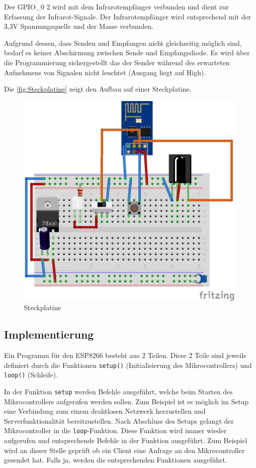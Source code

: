 Der \acs{GPIO}\_0 2 wird mit dem Infrarotempfänger verbunden und dient zur Erfassung der Infrarot-Signale.
Der Infrarotempfänger wird entsprechend mit der 3,3V Spannungsquelle und der Masse verbunden.

Aufgrund dessen, dass Senden und Empfangen nicht gleichzeitig möglich sind, bedarf es keiner Abschirmung zwischen Sende und Empfangsdiode. Es wird über die Programmierung sichergestellt das der Sender während des erwarteten Aufnehmens von Signalen nicht leuchtet (Ausgang liegt auf High).

Die \autoref{fig:Steckplatine} zeigt den Aufbau auf einer Steckplatine.

\begin{figure}
	\centering
	\includegraphics[scale=1]{Abbildungen/ESP8266_Steckplatine}
	\caption{Steckplatine}
	\label{fig:Steckplatine}
\end{figure}

\subsection{Implementierung}
Ein Programm für den ESP8266 besteht aus 2 Teilen.
Diese 2 Teile sind jeweils definiert durch die Funktionen \texttt{setup()} (Initialisierung des Mikrocontrollers) und \texttt{loop()} (Schleife).

In der Funktion \texttt{setup} werden Befehle ausgeführt, welche beim Starten des Mikrocontrollers aufgerufen werden sollen.
Zum Beispiel ist es möglich im Setup eine Verbindung zum einem drahtlosen Netzwerk herzustellen und Serverfunktionalität bereitzustellen.
Nach Abschluss des Setups gelangt der Mikrocontroller in die \texttt{loop}-Funktion.
Diese Funktion wird immer wieder aufgerufen und entsprechende Befehle in der Funktion ausgeführt.
Zum Beispiel wird an dieser Stelle geprüft ob ein Client eine Anfrage an den Mikrocontroller gesendet hat.
Falls ja, werden die entsprechenden Funktionen ausgeführt.


